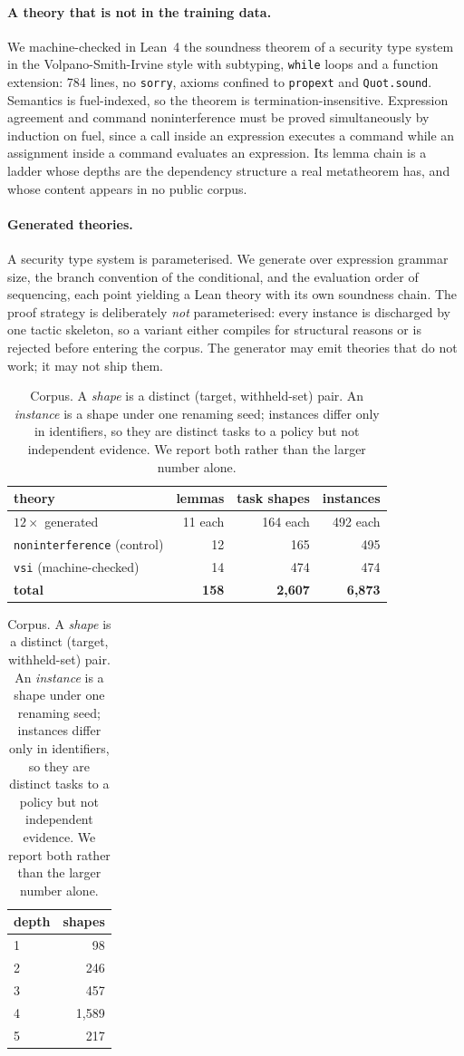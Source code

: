 \documentclass[10pt]{article}
\begin{document}
\paragraph{A theory that is not in the training data.}
We machine-checked in Lean~4 the soundness theorem of a security type system in
the Volpano-Smith-Irvine style with subtyping, \texttt{while} loops and a
function extension: 784 lines, no \texttt{sorry}, axioms confined to
\texttt{propext} and \texttt{Quot.sound}. Semantics is fuel-indexed, so the
theorem is termination-insensitive. Expression agreement and command
noninterference must be proved simultaneously by induction on fuel, since a call
inside an expression executes a command while an assignment inside a command
evaluates an expression. Its lemma chain is a ladder whose depths are the
dependency structure a real metatheorem has, and whose content appears in no
public corpus.

\paragraph{Generated theories.}
A security type system is parameterised. We generate over expression grammar
size, the branch convention of the conditional, and the evaluation order of
sequencing, each point yielding a Lean theory with its own soundness chain. The
proof strategy is deliberately \emph{not} parameterised: every instance is
discharged by one tactic skeleton, so a variant either compiles for structural
reasons or is rejected before entering the corpus. The generator may emit
theories that do not work; it may not ship them.

\begin{table}[h]\centering\small
\begin{tabular}{lrrr}
\toprule
theory & lemmas & task shapes & instances \\
\midrule
$12\times$ generated & 11 each & 164 each & 492 each \\
\texttt{noninterference} (control) & 12 & 165 & 495 \\
\texttt{vsi} (machine-checked) & 14 & 474 & 474 \\
\midrule
\textbf{total} & \textbf{158} & \textbf{2{,}607} & \textbf{6{,}873} \\
\bottomrule
\end{tabular}
\hfill
\begin{tabular}{lr}
\toprule
depth & shapes \\
\midrule
1 & 98 \\
2 & 246 \\
3 & 457 \\
4 & 1{,}589 \\
5 & 217 \\
\bottomrule
\end{tabular}
\caption{Corpus. A \emph{shape} is a distinct (target, withheld-set) pair. An
\emph{instance} is a shape under one renaming seed; instances differ only in
identifiers, so they are distinct tasks to a policy but not independent
evidence. We report both rather than the larger number alone.}
\label{tab:corpus}
\end{table}
\end{document}
